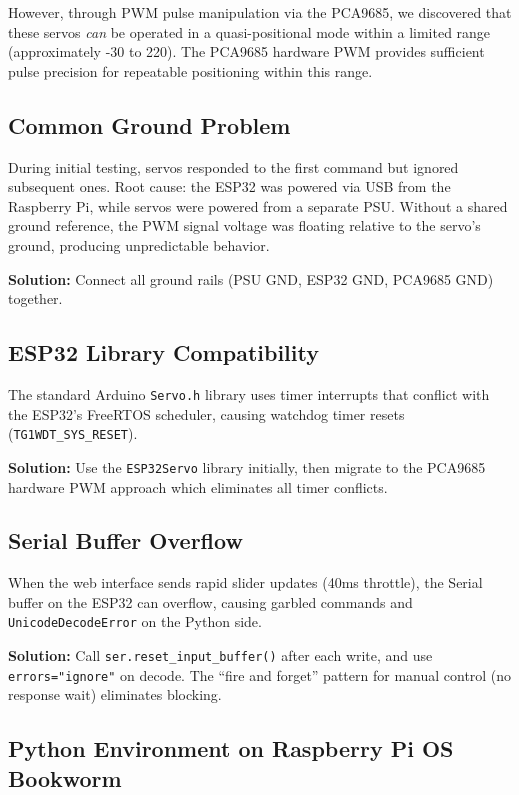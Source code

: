 \documentclass[12pt,a4paper]{article}
\begin{document}
However, through PWM pulse manipulation via the PCA9685, we discovered that these servos \textit{can} be operated in a quasi-positional mode within a limited range (approximately -30\textdegree{} to 220\textdegree). The PCA9685 hardware PWM provides sufficient pulse precision for repeatable positioning within this range.

\subsection{Common Ground Problem}

During initial testing, servos responded to the first command but ignored subsequent ones. Root cause: the ESP32 was powered via USB from the Raspberry Pi, while servos were powered from a separate PSU. Without a shared ground reference, the PWM signal voltage was floating relative to the servo's ground, producing unpredictable behavior.

\textbf{Solution:} Connect all ground rails (PSU GND, ESP32 GND, PCA9685 GND) together.

\subsection{ESP32 Library Compatibility}

The standard Arduino \texttt{Servo.h} library uses timer interrupts that conflict with the ESP32's FreeRTOS scheduler, causing watchdog timer resets (\texttt{TG1WDT\_SYS\_RESET}). 

\textbf{Solution:} Use the \texttt{ESP32Servo} library initially, then migrate to the PCA9685 hardware PWM approach which eliminates all timer conflicts.

\subsection{Serial Buffer Overflow}

When the web interface sends rapid slider updates (40ms throttle), the Serial buffer on the ESP32 can overflow, causing garbled commands and \texttt{UnicodeDecodeError} on the Python side.

\textbf{Solution:} Call \texttt{ser.reset\_input\_buffer()} after each write, and use \texttt{errors="ignore"} on decode. The ``fire and forget'' pattern for manual control (no response wait) eliminates blocking.

\subsection{Python Environment on Raspberry Pi OS Bookworm}
\end{document}
